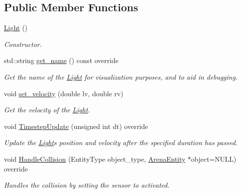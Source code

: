 \subsection*{Public Member Functions}
\begin{DoxyCompactItemize}
\item 
\hyperlink{classLight_aeb5df09a25a32f19fdffa761268ba24f}{Light} ()\hypertarget{classLight_aeb5df09a25a32f19fdffa761268ba24f}{}\label{classLight_aeb5df09a25a32f19fdffa761268ba24f}

\begin{DoxyCompactList}\small\item\em Constructor. \end{DoxyCompactList}\item 
std\+::string \hyperlink{classLight_a49b2e32cf8173353ac4689fdadbb95d5}{get\+\_\+name} () const override\hypertarget{classLight_a49b2e32cf8173353ac4689fdadbb95d5}{}\label{classLight_a49b2e32cf8173353ac4689fdadbb95d5}

\begin{DoxyCompactList}\small\item\em Get the name of the \hyperlink{classLight}{Light} for visualization purposes, and to aid in debugging. \end{DoxyCompactList}\item 
void \hyperlink{classLight_ad2cd99515d7e2e03d4e9ae1673143ff9}{set\+\_\+velocity} (double lv, double rv)
\begin{DoxyCompactList}\small\item\em Get the velocity of the \hyperlink{classLight}{Light}. \end{DoxyCompactList}\item 
void \hyperlink{classLight_a97934eec7489f9b072534f5e30a2d90d}{Timestep\+Update} (unsigned int dt) override
\begin{DoxyCompactList}\small\item\em Update the \hyperlink{classLight}{Light}\textquotesingle{}s position and velocity after the specified duration has passed. \end{DoxyCompactList}\item 
void \hyperlink{classLight_ad8f77c9857b26273d913a18be1311a11}{Handle\+Collision} (Entity\+Type object\+\_\+type, \hyperlink{classArenaEntity}{Arena\+Entity} $\ast$object=N\+U\+LL) override\hypertarget{classLight_ad8f77c9857b26273d913a18be1311a11}{}\label{classLight_ad8f77c9857b26273d913a18be1311a11}

\begin{DoxyCompactList}\small\item\em Handles the collision by setting the sensor to activated. \end{DoxyCompactList}\end{DoxyCompactItemize}

